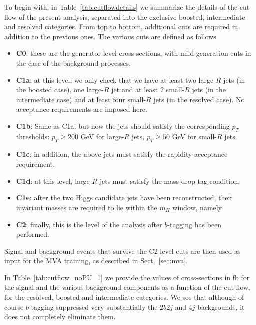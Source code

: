 To begin with,
in Table~\ref{tab:cutflowdetails}
we summarize the details of the cut-flow of the present analysis,
separated into the exclusive boosted, intermediate
    and resolved categories.
    From top to bottom, additional cuts are required in addition
    to the previous ones.
    The various cuts
    are defined as follows
    \begin{itemize}
    \item {\bf C0}: these are the generator level cross-sections, with
      mild generation cuts in the case of the background processes.
    \item {\bf C1a}: at this level, we only check that we have at least
      two large-$R$ jets (in the boosted case),
      one large-$R$ jet and at least 2 small-$R$ jets (in the intermediate
      case) and at least four small-$R$ jets (in the resolved case).
      No acceptance requirements are imposed here.
    \item {\bf C1b}: Same as C1a, but now the jets should
      satisfy the corresponding $p_T$ thresholds:
      $p_T \ge 200$ GeV for large-$R$ jets,
      $p_T \ge 50$ GeV for small-$R$ jets.
    \item {\bf C1c}: in addition, the above jets must satisfy the
      rapidity acceptance requirement.
    \item {\bf C1d}: at this level, large-$R$ jets must satisfy the
      mass-drop tag condition.
    \item {\bf C1e}: after the two Higgs candidate jets have been reconstructed,
      their invariant masses are required to lie within the
      $m_H$ window, namely
    \item {\bf C2}: finally, this is the level of the analysis
      after $b$-tagging has been performed.
      \end{itemize}
    Signal and background events that survive the C2 level cuts
    are then used as input for the MVA training, as described
    in Sect.~\ref{sec:mva}.


    In Table~\ref{tab:cutflow_noPU_1} we provide
    the values of cross-sections in fb
     for the signal
      and the various background
      components as a function of the
      cut-flow, for the resolved,
      boosted and intermediate
      categories.
      We see that although of course
      $b$-tagging suppressed very substantially the $2b2j$ and
      $4j$ backgrounds, it does not completely
      eliminate them.
    


